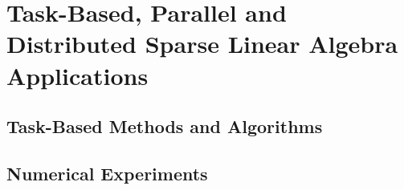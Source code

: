 \chapter{Task-Based, Parallel and Distributed Sparse Linear Algebra Applications}

\section{Task-Based Methods and Algorithms}


\section{Numerical Experiments}